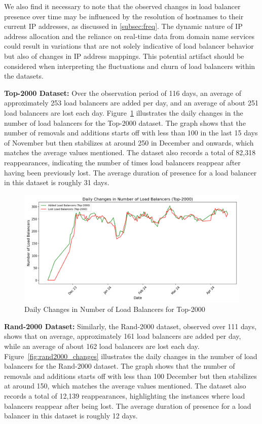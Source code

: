 \documentclass[12pt]{cwru_thesis}
\begin{document}
We also find it necessary to note that the observed changes in load balancer presence over time may be influenced by the resolution of hostnames to their current IP addresses, as discussed in \ref{subsec:freq}. The dynamic nature of IP address allocation and the reliance on real-time data from domain name services could result in variations that are not solely indicative of load balancer behavior but also of changes in IP address mappings. This potential artifact should be considered when interpreting the fluctuations and churn of load balancers within the datasets.

\textbf{Top-2000 Dataset:} Over the observation period of 116 days, an average of approximately 253 load balancers are added per day, and an average of about 251 load balancers are lost each day. Figure~\ref{fig:top2000_changes} illustrates the daily changes in the number of load balancers for the Top-2000 dataset. The graph shows that the number of removals and additions starts off with less than 100 in the last 15 days of November but then stabilizes at around 250 in December and onwards, which matches the average values mentioned. The dataset also records a total of 82,318 reappearances, indicating the number of times load balancers reappear after having been previously lost. The average duration of presence for a load balancer in this dataset is roughly 31 days.

\begin{figure}[h!]
    \centering
    \includegraphics[width=\linewidth]{figures/load_balancer_changes_Top-2000.png}
    \caption{Daily Changes in Number of Load Balancers for Top-2000}
    \label{fig:top2000_changes}
\end{figure}

\textbf{Rand-2000 Dataset:} Similarly, the Rand-2000 dataset, observed over 111 days, shows that on average, approximately 161 load balancers are added per day, while an average of about 162 load balancers are lost each day. Figure~\ref{fig:rand2000_changes} illustrates the daily changes in the number of load balancers for the Rand-2000 dataset. The graph shows that the number of removals and additions starts off with less than 100  December but then stabilizes at around 150, which matches the average values mentioned. The dataset also records a total of 12,139 reappearances, highlighting the instances where load balancers reappear after being lost. The average duration of presence for a load balancer in this dataset is roughly 12 days.
\end{document}
